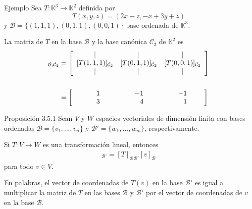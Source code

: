 \documentclass[handout]{beamer} %
\newcommand{\K}{\mathbb K}
\newcommand{\cC}{\mathcal{C}}
\newcommand{\cB}{\mathcal{B}}
\begin{document}
        \begin{frame}
        
        
        \begin{exampleblock}{Ejemplo}
        Sea $T:\K^3\longrightarrow\K^2$ definida por 
        $$T(x,y,z)=(2x-z,-x+3y+z)$$
        y $\cB=\{(1,1,1),(0,1,1),(0,0,1)\}$ base ordenada de $\K^3$.
        
        La matriz de $T$ en la base $\cB$ y la base canónica $\cC_2$ de $\K^2$ es
        \begin{align*}
        [T]_{\cB,\cC_2}
        &=\left[
        \begin{array}{ccc}
        \mid& \mid& \mid\\
        $[$T(1,1,1)$]$_{\cC_2}&$[$T(0,1,1)$]$_{\cC_2}&$[$T(0,0,1)$]$_{\cC_2}\\
        \mid& \mid& \mid
        \end{array}
        \right]\\
        \\
        &=\left[
             \begin{array}{rrr}
        \quad\quad\quad1&\quad\quad\quad\quad-1&\quad\quad\quad\quad-1\quad\quad\\3&4&1\quad\quad
        \end{array}
        \right] 
        \end{align*}
        \end{exampleblock}
        
        
        \end{frame}
    
    
\begin{frame}

    \begin{block}{Proposición 3.5.1}
    Sean $V$ y $W$ espacios vectoriales de dimensión finita con bases ordenadas $\cB=\{v_1, ..., v_n\}$ y $\cB'=\{w_1, ..., w_m\}$, respectivamente. 
    
    Si $T:V\longrightarrow W$ es una transformación lineal, entonces
    \begin{align*}
    [T(v)]_{\cB'}=[T]_{\cB\cB'}[v]_{\cB}
    \end{align*}
    para todo $v\in V$.
    \end{block}
    \pause
    En palabras, el vector de coordenadas de $T(v)$ en la base $\cB'$ es igual a multiplicar la matriz de $T$ en las bases $\cB$ y $\cB'$ por el vector de coordenadas de $v$ en la base $\cB$.
    
    \
    
    
    
    \end{frame}
    
\end{document}
